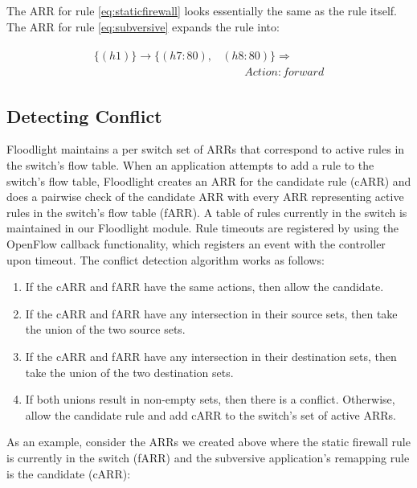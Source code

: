 The ARR for rule \ref{eq:staticfirewall} looks essentially the same as the rule itself.
The ARR for rule \ref{eq:subversive} expands the rule into:

\begin{align}
\begin{aligned}
\{(h1)\} \rightarrow \{(h7:80),&(h8:80)\} \Rightarrow \\ 
     &\qquad Action: forward \nonumber
\end{aligned}
\end{align}

\subsection{Detecting Conflict}
\label{subsec:conflict}
Floodlight maintains a per switch set of ARRs that correspond to active rules in the switch's flow table.
When an application attempts to add a rule to the switch's flow table, Floodlight creates an ARR for the candidate rule (cARR) and does a pairwise check of the candidate ARR with every ARR representing active rules in the switch's flow table (fARR). A table of rules currently in the switch is maintained in our Floodlight module. Rule timeouts are registered by using the OpenFlow callback functionality, which registers an event with the controller upon timeout. %
The conflict detection algorithm works as follows:
\begin{enumerate}
\item If the cARR and fARR have the same actions, then allow the candidate.
\item If the cARR and fARR have any intersection in their source sets, then take the union of the two source sets.
\item If the cARR and fARR have any intersection in their destination sets, then take the union of the two destination sets.
\item If both unions result in non-empty sets, then there is a conflict. Otherwise, allow the candidate rule and add cARR to the switch's set of active ARRs.
\end{enumerate} 

As an example, consider the ARRs we created above where the static firewall rule is currently in the switch (fARR) and the subversive application's remapping rule is the candidate (cARR):

